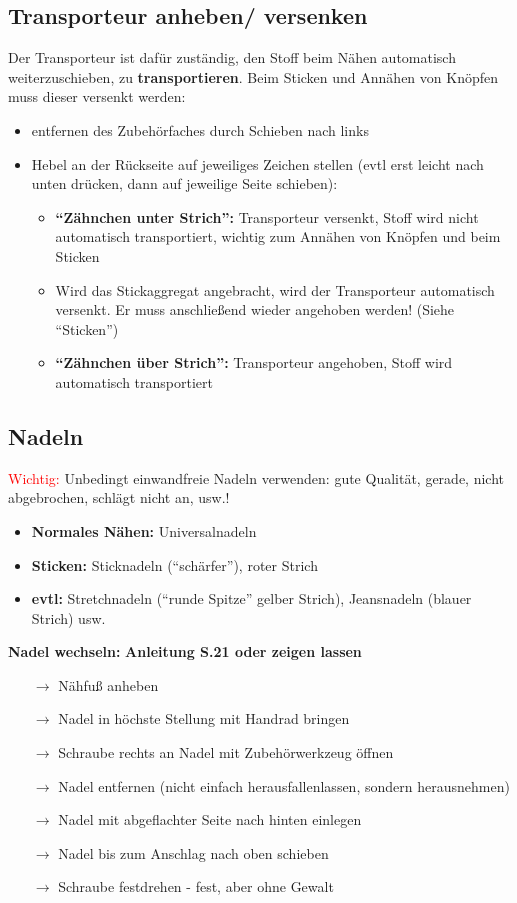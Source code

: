 \documentclass{\basedir/fablab-document}
\newcommand{\pfeil}{\ensuremath{\rightarrow}}
\begin{document}
\subsection{Transporteur anheben/ versenken}
Der Transporteur ist dafür zuständig, den Stoff beim Nähen automatisch weiterzuschieben, zu \textbf{transportieren}. 
\newline Beim Sticken und Annähen von Knöpfen muss dieser versenkt werden:
\begin{itemize}
 \item entfernen des Zubehörfaches durch Schieben nach links
 \item Hebel an der Rückseite auf jeweiliges Zeichen stellen (evtl erst leicht nach unten drücken, dann auf jeweilige Seite schieben):
	\begin{itemize}
 	 \item \textbf{“Zähnchen unter Strich”:} Transporteur versenkt, Stoff wird nicht automatisch
transportiert, wichtig zum Annähen von Knöpfen und beim Sticken
 	 \item Wird das Stickaggregat angebracht, wird der Transporteur automatisch versenkt. Er muss anschließend wieder angehoben werden! (Siehe “Sticken”)
 	 \item \textbf{“Zähnchen über Strich”:} Transporteur angehoben, Stoff wird automatisch transportiert 
	\end{itemize}
\end{itemize}

\subsection{Nadeln}
\textcolor{red}{Wichtig:} Unbedingt einwandfreie Nadeln verwenden: gute Qualität, gerade, nicht abgebrochen, schlägt nicht an, usw.!
\begin{itemize}
 \item \textbf{Normales Nähen:} Universalnadeln
 \item \textbf{Sticken:} Sticknadeln (“schärfer”), roter Strich
 \item \textbf{evtl:} Stretchnadeln (“runde Spitze” gelber Strich), Jeansnadeln (blauer Strich) usw.
\end{itemize}

\vspace{2em}

\textbf{Nadel wechseln:}
\newline \textbf{Anleitung S.21 oder zeigen lassen}
\begin{itemize}
 \item[\pfeil] Nähfuß anheben
 \item[\pfeil] Nadel in höchste Stellung mit Handrad bringen
 \item[\pfeil] Schraube rechts an Nadel mit Zubehörwerkzeug öffnen
 \item[\pfeil] Nadel entfernen (nicht einfach herausfallenlassen, sondern herausnehmen)
 \item[\pfeil] Nadel mit abgeflachter Seite nach hinten einlegen
 \item[\pfeil] Nadel bis zum Anschlag nach oben schieben
 \item[\pfeil] Schraube festdrehen -  fest, aber ohne Gewalt
\end{itemize}
\end{document}
